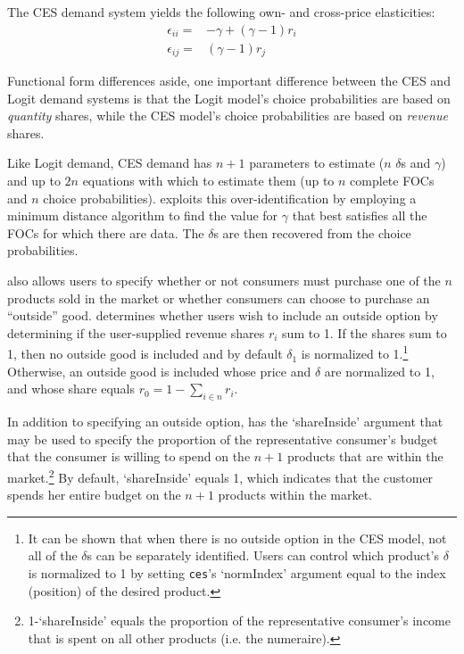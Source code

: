 \documentclass[11pt,numbers=noenddot,pointlessnumbers]{scrreprt}
\numberwithin{equation}{section}
\begin{document}
The CES demand system yields the following own- and cross-price elasticities:
\begin{align*}
  \epsilon_{ii}=& -\gamma + (\gamma-1)r_i \\
  \epsilon_{ij}=& (\gamma-1)r_j
\end{align*}



Functional form differences aside, one important difference between
the CES and Logit demand systems is that the Logit model's choice
probabilities are based on \emph{quantity} shares, while the CES model's
choice probabilities are based on \emph{revenue} shares.

Like Logit demand, CES demand has $n+1$ parameters to estimate ($n$ $\delta$s and
$\gamma$) and up to $2n$ equations with which to estimate them (up to
$n$ complete FOCs and $n$
choice probabilities). \verb@ces@ exploits this over-identification
by employing a minimum distance algorithm to find the
value for $\gamma$ that best satisfies all the FOCs for which there
are data. The $\delta$s are then recovered from the choice probabilities.



\verb@ces@ also allows
users to specify whether or not consumers must purchase one of the $n$
products sold in the market or whether consumers can choose to
purchase an ``outside'' good.  \verb@ces@ determines whether users
wish to include an outside option by determining if the user-supplied
revenue shares $r_i$ sum to 1. If the shares sum to 1, then no outside good is
included and by default $\delta_1$ is normalized to 1.\footnote{It can
  be shown that when there is no outside option in the CES model,
  not all of the $\delta$s can be separately identified. Users can
  control which product's $\delta$ is normalized to 1 by setting
  \texttt{ces}'s `normIndex' argument equal to the index (position) of the desired
  product.} Otherwise, an outside good is included whose price and
$\delta$ are normalized to 1, and whose share equals $r_0=1-\sum\limits_{i\in n}r_i$.


In addition to specifying an outside option, \verb@ces@ has the
`shareInside' argument that may be used to specify the proportion of
the representative consumer's budget that the consumer is willing to spend
on the  $n + 1$ products that are within the
market.\footnote{1-`shareInside' equals the proportion of the
  representative consumer's income that is spent on all other products
  (i.e. the numeraire).} By default,
`shareInside' equals 1, which indicates that the customer spends her
entire budget on the $n+1$ products within the market.
\end{document}
